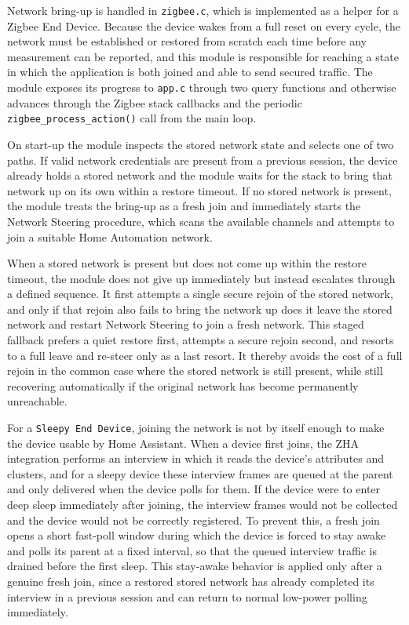 Network bring-up is handled in \texttt{zigbee.c}, which is implemented as a helper for a Zigbee End Device.
Because the device wakes from a full reset on every cycle, the network must be established or restored from scratch each time before any measurement can be reported, and this module is responsible for reaching a state in which the application is both joined and able to send secured traffic.
The module exposes its progress to \texttt{app.c} through two query functions and otherwise advances through the Zigbee stack callbacks and the periodic \texttt{zigbee\_process\_action()} call from the main loop.

On start-up the module inspects the stored network state and selects one of two paths.
If valid network credentials are present from a previous session, the device already holds a stored network and the module waits for the stack to bring that network up on its own within a restore timeout.
If no stored network is present, the module treats the bring-up as a fresh join and immediately starts the Network Steering procedure, which scans the available channels and attempts to join a suitable Home Automation network.

When a stored network is present but does not come up within the restore timeout, the module does not give up immediately but instead escalates through a defined sequence.
It first attempts a single secure rejoin of the stored network, and only if that rejoin also fails to bring the network up does it leave the stored network and restart Network Steering to join a fresh network.
This staged fallback prefers a quiet restore first, attempts a secure rejoin second, and resorts to a full leave and re-steer only as a last resort. It thereby avoids the cost of a full rejoin in the common case where the stored network is still present, while still recovering automatically if the original network has become permanently unreachable.

For a \texttt{Sleepy End Device}, joining the network is not by itself enough to make the device usable by Home Assistant.
When a device first joins, the ZHA integration performs an interview in which it reads the device's attributes and clusters, and for a sleepy device these interview frames are queued at the parent and only delivered when the device polls for them.
If the device were to enter deep sleep immediately after joining, the interview frames would not be collected and the device would not be correctly registered.
To prevent this, a fresh join opens a short fast-poll window during which the device is forced to stay awake and polls its parent at a fixed interval, so that the queued interview traffic is drained before the first sleep.
This stay-awake behavior is applied only after a genuine fresh join, since a restored stored network has already completed its interview in a previous session and can return to normal low-power polling immediately.

